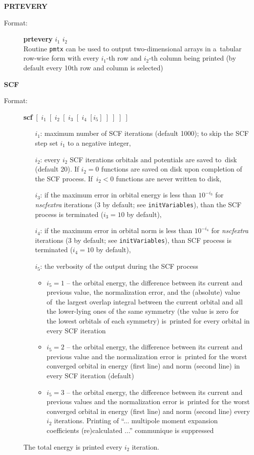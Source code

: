 \documentclass[10pt,a4paper]{article}
\newcommand{\ft}[1]{\texttt{#1}}
\begin{document}
\begin{description}
\item \textbf{PRTEVERY}
\begin{description}
\item[Format:] \textbf{prtevery} $i_1$ $i_2$ \\ Routine \ft{pmtx} can be used to output
  two-dimensional arrays in a~tabular row-wise form with every $i_1$-th row and $i_2$-th
  column being printed (by default every 10th row and column is selected)
\end{description}


\item \textbf{SCF}
\begin{description}
\item[Format:] \textbf{scf}
$[\;i_1\;[\;i_2\;[\;i_3\;[\;i_4\;[i_5]\;]\;]\;]\;]$
\begin{itemize}
\item[$i_1$:] maximum number of SCF iterations (default 1000); to skip the
  SCF step set $i_1$ to a negative integer,
\item[$i_2$:] every $i_2$ SCF iterations orbitals and potentials are saved
  to~disk (default 20).  If $i_2=0$ functions are saved on disk upon
  completion of the SCF process. If~$i_2<0$ functions are never written to
  disk,
\item[$i_3$:] if the maximum error in orbital energy is less than
  $10^{-i_3}$ for \textsl{nscfextra} iterations (3 by default; see
  \ft{initVariables}), than the SCF process is terminated ($i_3=10$ by default),
\item[$i_4$:] if the maximum error in orbital norm is less than $10^{-i_4}$
  for \textsl{nscfextra} iterations (3 by default; see \ft{initVariables}), than
  SCF process is terminated ($i_4=10$ by default),
\item[$i_5$:] the verbosity of the output during the SCF process
\begin{itemize}
\item $i_5=1$ -- the orbital energy, the difference between its current and previous
  value, the normalization error, and the (absolute) value of~the largest overlap integral
  between the current orbital and all the lower-lying ones of the same symmetry (the value
  is zero for the lowest orbitals of each symmetry) is~printed for every orbital in every
  SCF iteration
\item $i_5=2$ -- the orbital energy, the difference between its current and previous value
  and the normalization error is~printed for the worst converged orbital in energy (first
  line) and norm (second line) in every SCF iteration (default)
\item $i_5=3$ -- the orbital energy, the difference between its current and previous values
  and the normalization error is~printed for the worst converged orbital in energy (first
  line) and norm (second line) every $i_2$ iterations. Printing of ``... multipole moment
  expansion coefficients (re)calculated ...''  communique is suppressed
\end{itemize}
\end{itemize}
The total energy is printed every $i_2$ iteration.
\end{description}


\end{description}
\end{document}
